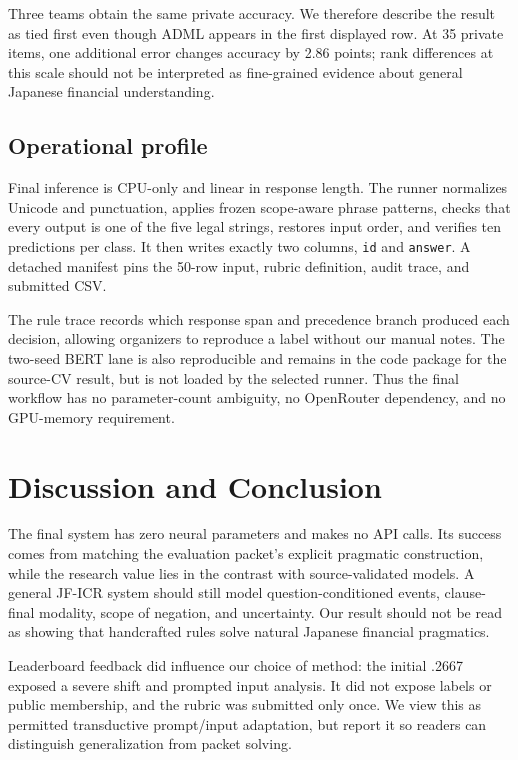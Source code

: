 \documentclass[11pt]{article}
\begin{document}
Three teams obtain the same private accuracy.  We therefore describe the result
as tied first even though ADML appears in the first displayed row.  At 35
private items, one additional error changes accuracy by 2.86 points; rank
differences at this scale should not be interpreted as fine-grained evidence
about general Japanese financial understanding.

\subsection{Operational profile}
Final inference is CPU-only and linear in response length.  The runner
normalizes Unicode and punctuation, applies frozen scope-aware phrase patterns,
checks that every output is one of the five legal strings, restores input order,
and verifies ten predictions per class.  It then writes exactly two columns,
\texttt{id} and \texttt{answer}.  A detached manifest pins the 50-row input,
rubric definition, audit trace, and submitted CSV.

The rule trace records which response span and precedence branch produced each
decision, allowing organizers to reproduce a label without our manual notes.
The two-seed BERT lane is also reproducible and remains in the code package for
the source-CV result, but is not loaded by the selected runner.  Thus the final
workflow has no parameter-count ambiguity, no OpenRouter dependency, and no
GPU-memory requirement.

\section{Discussion and Conclusion}
The final system has zero neural parameters and makes no API calls. Its success comes from matching the evaluation packet's explicit pragmatic construction, while the research value lies in the contrast with source-validated models. A general JF-ICR system should still model question-conditioned events, clause-final modality, scope of negation, and uncertainty. Our result should not be read as showing that handcrafted rules solve natural Japanese financial pragmatics.

Leaderboard feedback did influence our choice of method: the initial .2667 exposed a severe shift and prompted input analysis. It did not expose labels or public membership, and the rubric was submitted only once. We view this as permitted transductive prompt/input adaptation, but report it so readers can distinguish generalization from packet solving.
\end{document}
